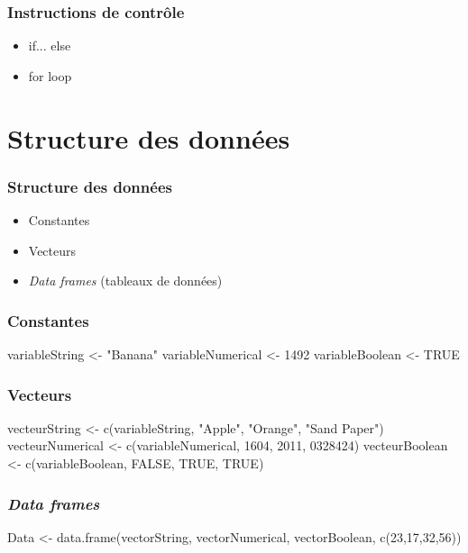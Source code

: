 \documentclass{beamer}
\begin{document}
    \begin{frame}
        \frametitle{Instructions de contrôle}
        \begin{itemize}
            \item if... else
            \item for loop
        \end{itemize}
    \end{frame}

\section{\R {} Structure des données}

    \begin{frame}
        \frametitle{Structure des données}
        \begin{itemize}
            \item<1-> Constantes
            \item<2-> Vecteurs
            \item<3-> \emph{Data frames} (tableaux de données)
        \end{itemize}
    \end{frame}
    
    \begin{frame}[fragile=singleslide]
        \frametitle{Constantes}
        \begin{code}
variableString <- "Banana"
variableNumerical <- 1492
variableBoolean <- TRUE
        \end{code}
    \end{frame}
    
    \begin{frame}[fragile=singleslide]
        \frametitle{Vecteurs}
        \begin{code}
vecteurString <- c(variableString, "Apple", "Orange", "Sand Paper")
vecteurNumerical <- c(variableNumerical, 1604, 2011, 0328424)
vecteurBoolean <- c(variableBoolean, FALSE, TRUE, TRUE)
        \end{code}
    \end{frame}
    
    \begin{frame}[fragile=singleslide]
        \frametitle{\emph{Data frames}}
        \begin{code}
Data <- data.frame(vectorString, vectorNumerical, vectorBoolean, c(23,17,32,56))
        \end{code}
    \end{frame}
\end{document}
